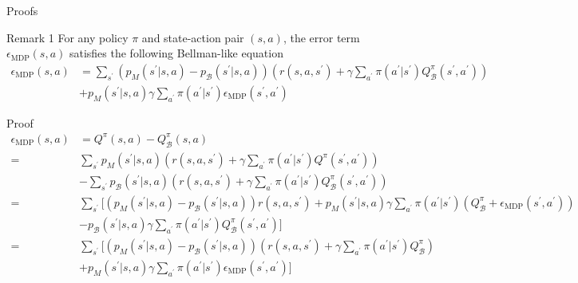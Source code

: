 \documentclass[11pt]{beamer}
\newcommand{\mc}[1]{\mathcal{#1}}
\begin{document}
\begin{frame}{Proofs}
    \begin{block}{Remark 1}
        For any policy $\pi$ and state-action pair $(s,a)$, the error term $\epsilon_{\text{MDP}}(s,a)$ satisfies the following Bellman-like equation
        \[
        \begin{aligned}
            \epsilon_{\text{MDP}}(s,a) &= \sum_{s^\prime} (p_M(s^\prime|s,a) - p_{\mc{B}}(s^\prime|s,a)) \left(r(s,a,s^\prime)+\gamma \sum_{a^\prime}\pi(a^\prime | s^\prime) Q^\pi_{\mc{B}}(s^\prime, a^\prime) \right) \\
            &+ p_M(s^\prime |s,a) \gamma \sum_{a^\prime} \pi(a^\prime |s^\prime) \epsilon_{\text{MDP}}(s^\prime, a^\prime)
        \end{aligned}
        \]

        \smallskip
        Proof
        \[
        \begin{aligned}
            \epsilon_{\text{MDP}}(s,a) &= Q^{\pi}(s,a) - Q^\pi_{\mc{B}}(s,a) \\
            =& \sum_{s^\prime} p_M(s^\prime|s,a) \left(r(s,a,s^\prime) + \gamma \sum_{a^\prime} \pi(a^\prime|s^\prime) Q^\pi(s^\prime, a^\prime)\right) \\
            &- \sum_{s^\prime}p_{\mc{B}}(s^\prime|s,a) \left(r(s,a,s^\prime) + \gamma \sum_{a^\prime} \pi(a^\prime|s^\prime) Q^\pi_{\mc{B}}(s^\prime, a^\prime)\right) \\
            =&\sum_{s^\prime} \Big[(p_M(s^\prime|s,a) - p_{\mc{B}}(s^\prime|s,a))r(s,a,s^\prime) + p_M(s^\prime|s,a) \gamma \sum_{a^\prime} \pi(a^\prime|s^\prime) (Q^\pi_{\mc{B}}+\epsilon_{\text{MDP}}(s^\prime,a^\prime))\\
            & - p_{\mc{B}}(s^\prime|s,a) \gamma \sum_{a^\prime} \pi(a^\prime|s^\prime) Q^\pi_{\mc{B}}(s^\prime, a^\prime) \Big] \\
            \label{eq:remark1}
            =& \sum_{s^\prime} \Big[(p_M(s^\prime|s,a) - p_{\mc{B}}(s^\prime|s,a))\left(r(s,a,s^\prime) + \gamma \sum_{a^\prime}\pi(a^\prime|s^\prime) Q^\pi_{\mc{B}}\right) \\
            &+ p_M(s^\prime|s,a) \gamma \sum_{a^\prime} \pi(a^\prime|s^\prime)\epsilon_{\text{MDP}}(s^\prime,a^\prime) \Big]
        \end{aligned}
        \]
    \end{block}
\end{frame}
\end{document}

